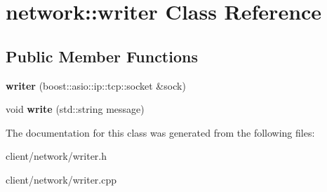 \hypertarget{classnetwork_1_1writer}{\section{network\-:\-:writer Class Reference}
\label{classnetwork_1_1writer}
}
\subsection*{Public Member Functions}
\begin{DoxyCompactItemize}
\item 
\hypertarget{classnetwork_1_1writer_a4f4f8f77504715a537c01cb050ae3a70}{{\bfseries writer} (boost\-::asio\-::ip\-::tcp\-::socket \&sock)}\label{classnetwork_1_1writer_a4f4f8f77504715a537c01cb050ae3a70}

\item 
\hypertarget{classnetwork_1_1writer_aad63316b3be96ce8a5d0cd2595cc020f}{void {\bfseries write} (std\-::string message)}\label{classnetwork_1_1writer_aad63316b3be96ce8a5d0cd2595cc020f}

\end{DoxyCompactItemize}


The documentation for this class was generated from the following files\-:\begin{DoxyCompactItemize}
\item 
client/network/writer.\-h\item 
client/network/writer.\-cpp\end{DoxyCompactItemize}
